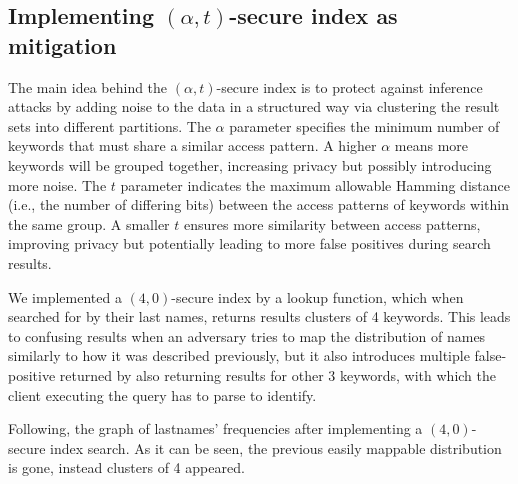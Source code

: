 \subsection{Implementing $(\alpha, t)$-secure index as mitigation}

The main idea behind the $(\alpha,t)$-secure index is to protect against inference attacks by adding noise to the data in a structured way via clustering the result sets into different partitions. The $\alpha$ parameter specifies the minimum number of keywords that must share a similar access pattern. A higher $\alpha$ means more keywords will be grouped together, increasing privacy but possibly introducing more noise. The $t$ parameter indicates the maximum allowable Hamming distance (i.e., the number of differing bits) between the access patterns of keywords within the same group. A smaller $t$ ensures more similarity between access patterns, improving privacy but potentially leading to more false positives during search results.

We implemented a $(4,0)$-secure index by a lookup function, which when searched for by their last names, returns results clusters of 4 keywords. This leads to confusing results when an adversary tries to map the distribution of names similarly to how it was described previously, but it also introduces multiple false-positive returned by also returning results for other 3 keywords, with which the client executing the query has to parse to identify.

Following, the graph of lastnames' frequencies after implementing a $(4, 0)$-secure index search. As it can be seen, the previous easily mappable distribution is gone, instead clusters of 4 appeared.

